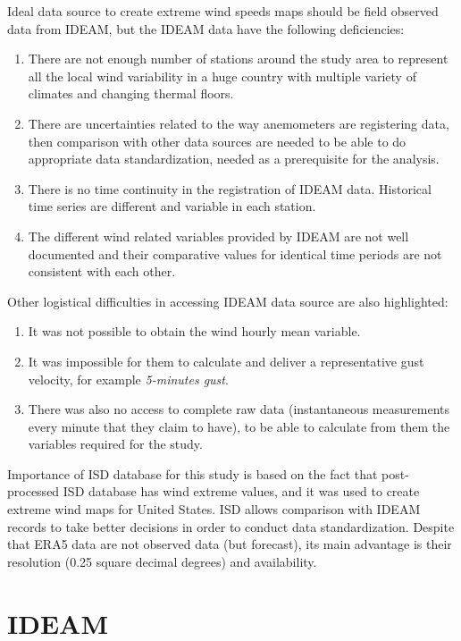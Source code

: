 \documentclass[12pt,oneside]{reedthesis}
\begin{document}
Ideal data source to create extreme wind speeds maps should be field observed data from IDEAM, but the IDEAM data have the following deficiencies:
\begin{enumerate}
\def\labelenumi{\arabic{enumi}.}
\item
  There are not enough number of stations around the study area to represent all the local wind variability in a huge country with multiple variety of climates and changing thermal floors.
\item
  There are uncertainties related to the way anemometers are registering data, then comparison with other data sources are needed to be able to do appropriate data standardization, needed as a prerequisite for the analysis.
\item
  There is no time continuity in the registration of IDEAM data. Historical time series are different and variable in each station.
\item
  The different wind related variables provided by IDEAM are not well documented and their comparative values for identical time periods are not consistent with each other.
\end{enumerate}
Other logistical difficulties in accessing IDEAM data source are also highlighted:
\begin{enumerate}
\def\labelenumi{\arabic{enumi}.}
\item
  It was not possible to obtain the wind hourly mean variable.
\item
  It was impossible for them to calculate and deliver a representative gust velocity, for example \emph{5-minutes gust}.
\item
  There was also no access to complete raw data (instantaneous measurements every minute that they claim to have), to be able to calculate from them the variables required for the study.
\end{enumerate}
Importance of ISD database for this study is based on the fact that post-processed ISD database has wind extreme values, and it was used to create extreme wind maps for United States. ISD allows comparison with IDEAM records to take better decisions in order to conduct data standardization. Despite that ERA5 data are not observed data (but forecast), its main advantage is their resolution (0.25 square decimal degrees) and availability.

\hypertarget{ideam}{%
\section{IDEAM}\label{ideam}}
\end{document}
